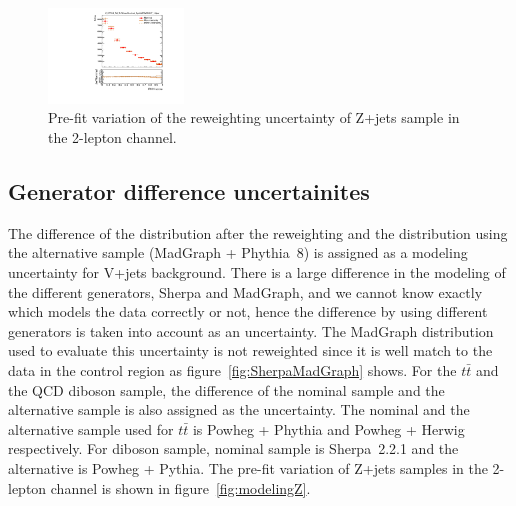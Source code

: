 \begin{figure}[H]
\begin{center}
 \includegraphics[width=0.32\textwidth,keepaspectratio]{figures/syst/Z_0ptag2pjet_0ptv_SRVBS_Fid_RNNScoreResolved_SysMJJREWEIGHT_100per.pdf}
 \caption[f]{
Pre-fit variation of the reweighting uncertainty of Z+jets sample in the 2-lepton channel.
}
\label{fig:mjjreweighting}
\end{center}
\end{figure}

\subsection{Generator difference uncertainites}
The difference of the distribution after the reweighting and the distribution using the alternative sample (MadGraph + Phythia~8) is assigned as a modeling uncertainty for V+jets background. There is a large difference in the modeling of the different generators, Sherpa and MadGraph, and we cannot know exactly which models the data correctly or not, hence the difference by using different generators is taken into account as an uncertainty. The MadGraph distribution used to evaluate this uncertainty is not reweighted since it is well match to the data in the control region as figure~\ref{fig:SherpaMadGraph} shows.
For the $t\bar{t}$ and the QCD diboson sample, the difference of the nominal sample and the alternative sample is also assigned as the uncertainty.
The nominal and the alternative sample used for $t\bar{t}$ is Powheg + Phythia and Powheg + Herwig respectively.
For diboson sample, nominal sample is Sherpa~2.2.1 and the alternative is Powheg + Pythia.
The pre-fit variation of Z+jets samples in the 2-lepton channel is shown in figure~\ref{fig:modelingZ}.
